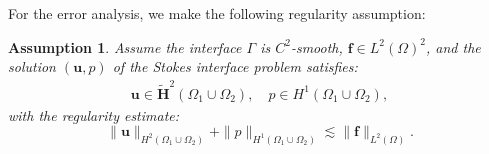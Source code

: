 \documentclass[a4paper,11pt,fleqn]{article}
\newtheorem{assumption}[theorem]{Assumption}
\numberwithin{equation}{section}
\begin{document}
For the error analysis, we make the following regularity assumption:
\begin{assumption}\label{ass:regularity}
	Assume the interface $\Gamma$ is $C^2$-smooth, $\boldsymbol{f} \in L^2(\Omega)^2$, 
	and the solution $(\boldsymbol{u}, p)$ of the Stokes interface problem satisfies:
	\begin{align*}
		\boldsymbol{u} \in \boldsymbol{\tilde{H}}^2(\Omega_1 \cup \Omega_2), \quad	p \in H^1(\Omega_1 \cup \Omega_2),
	\end{align*}
	with the regularity estimate:
	\begin{equation}
		\|\boldsymbol{u}\|_{H^2(\Omega_1 \cup \Omega_2)} + \|p\|_{H^1(\Omega_1 \cup \Omega_2)} \lesssim \|\boldsymbol{f}\|_{L^2(\Omega)}.
	\end{equation}
\end{assumption}
 
\end{document}
